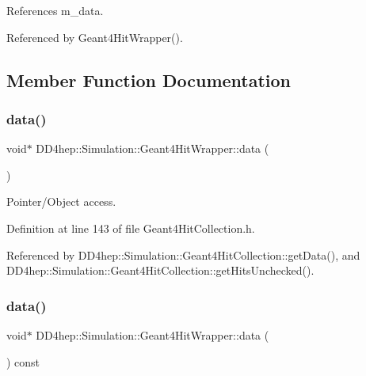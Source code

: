 References m\+\_\+data.



Referenced by Geant4\+Hit\+Wrapper().



\subsection{Member Function Documentation}
\hypertarget{class_d_d4hep_1_1_simulation_1_1_geant4_hit_wrapper_af7b7738a7307f1f9372dc37efc319dc6}{}\label{class_d_d4hep_1_1_simulation_1_1_geant4_hit_wrapper_af7b7738a7307f1f9372dc37efc319dc6} 
\subsubsection{\texorpdfstring{data()}{data()}\hspace{0.1cm}{\footnotesize\ttfamily [1/2]}}
{\footnotesize\ttfamily void$\ast$ D\+D4hep\+::\+Simulation\+::\+Geant4\+Hit\+Wrapper\+::data (\begin{DoxyParamCaption}{ }\end{DoxyParamCaption})\hspace{0.3cm}{\ttfamily [inline]}}



Pointer/\+Object access. 



Definition at line 143 of file Geant4\+Hit\+Collection.\+h.



Referenced by D\+D4hep\+::\+Simulation\+::\+Geant4\+Hit\+Collection\+::get\+Data(), and D\+D4hep\+::\+Simulation\+::\+Geant4\+Hit\+Collection\+::get\+Hits\+Unchecked().

\hypertarget{class_d_d4hep_1_1_simulation_1_1_geant4_hit_wrapper_a9d048768dce3e8f79898e98ea90b0041}{}\label{class_d_d4hep_1_1_simulation_1_1_geant4_hit_wrapper_a9d048768dce3e8f79898e98ea90b0041} 
\subsubsection{\texorpdfstring{data()}{data()}\hspace{0.1cm}{\footnotesize\ttfamily [2/2]}}
{\footnotesize\ttfamily void$\ast$ D\+D4hep\+::\+Simulation\+::\+Geant4\+Hit\+Wrapper\+::data (\begin{DoxyParamCaption}{ }\end{DoxyParamCaption}) const\hspace{0.3cm}{\ttfamily [inline]}}



